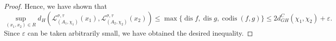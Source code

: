 \documentclass[10pt,a4paper]{amsart}
\DeclareMathOperator{\codis}{codis}
\DeclareMathOperator{\dis}{dis}
\newcommand{\GH}{d_{GH}}
\newcommand{\MP}[1]{(A_{#1},\chi_{#1})}
\begin{document}
\begin{proof}
Hence, we have shown that
\[
    \sup_{(x_1,x_2)\in R}d_H(\mathcal L_{\MP{1}}^{\sigma,\tau}(x_1),\mathcal L_{\MP{2}}^{\sigma,\tau}(x_2))\leq\max\{\dis f,\dis g,\codis(f,g)\}\leq 2\GH^C(\chi_1,\chi_2)+\varepsilon.
\]
Since $\varepsilon$ can be taken arbitrarily small, we have obtained the desired inequality.
\end{proof}
\end{document}

